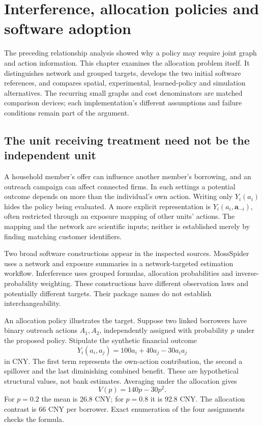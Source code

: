 \chapter{Interference, allocation policies and software adoption}
\label{v13:sw-networks}

The preceding relationship analysis showed why a policy may require joint
graph and action information. This chapter examines the allocation problem
itself. It distinguishes network and grouped targets, develops the two initial
software references, and compares spatial, experimental, learned-policy and
simulation alternatives. The recurring small graphs and cost denominators are
matched comparison devices; each implementation's different assumptions and
failure conditions remain part of the argument.

\section{The unit receiving treatment need not be the independent unit}

A household member's offer can influence another member's borrowing, and an
outreach campaign can affect connected firms. In such settings a potential
outcome depends on more than the individual's own action. Writing only
$Y_i(a_i)$ hides the policy being evaluated. A more explicit representation is
$Y_i(a_i,\mathbf a_{-i})$, often restricted through an exposure mapping of
other units' actions. The mapping and the network are scientific inputs;
neither is established merely by finding matching customer identifiers.

Two broad software constructions appear in the inspected sources. MossSpider
uses a network and exposure summaries in a network-targeted estimation
workflow. Inferference uses grouped formulas, allocation probabilities and
inverse-probability weighting. These constructions have different observation
laws and potentially different targets. Their package names do not establish
interchangeability. \citep{v13_sw_mossspider,v13_sw_inferference}

An allocation policy illustrates the target. Suppose two linked borrowers have
binary outreach actions $A_1,A_2$, independently assigned with probability $p$
under the proposed policy. Stipulate the synthetic financial outcome
\[
 Y_i(a_i,a_j)=100a_i+40a_j-30a_i a_j
\]
in CNY. The first term represents the own-action contribution, the second a
spillover and the last diminishing combined benefit. These are hypothetical
structural values, not bank estimates. Averaging under the allocation gives
\[
 V(p)=140p-30p^2.
\]
For $p=0.2$ the mean is 26.8 CNY; for $p=0.8$ it is 92.8 CNY. The allocation
contrast is 66 CNY per borrower. Exact enumeration of the four assignments
checks the formula. \citep{v13_project_exact}

